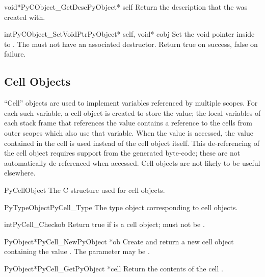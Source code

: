 \begin{cfuncdesc}{void*}{PyCObject_GetDesc}{PyObject* self}
  Return the description  that the 
   was created with.
\end{cfuncdesc}

\begin{cfuncdesc}{int}{PyCObject_SetVoidPtr}{PyObject* self, void* cobj}
  Set the void pointer inside  to .
  The  must not have an associated destructor.
  Return true on success, false on failure.
\end{cfuncdesc}


\subsection{Cell Objects \label{cell-objects}}

``Cell'' objects are used to implement variables referenced by
multiple scopes.  For each such variable, a cell object is created to
store the value; the local variables of each stack frame that
references the value contains a reference to the cells from outer
scopes which also use that variable.  When the value is accessed, the
value contained in the cell is used instead of the cell object
itself.  This de-referencing of the cell object requires support from
the generated byte-code; these are not automatically de-referenced
when accessed.  Cell objects are not likely to be useful elsewhere.

\begin{ctypedesc}{PyCellObject}
  The C structure used for cell objects.
\end{ctypedesc}

\begin{cvardesc}{PyTypeObject}{PyCell_Type}
  The type object corresponding to cell objects.
\end{cvardesc}

\begin{cfuncdesc}{int}{PyCell_Check}{ob}
  Return true if  is a cell object;  must not be
  \NULL{}.
\end{cfuncdesc}

\begin{cfuncdesc}{PyObject*}{PyCell_New}{PyObject *ob}
  Create and return a new cell object containing the value .
  The parameter may be \NULL{}.
\end{cfuncdesc}

\begin{cfuncdesc}{PyObject*}{PyCell_Get}{PyObject *cell}
  Return the contents of the cell .
\end{cfuncdesc}

